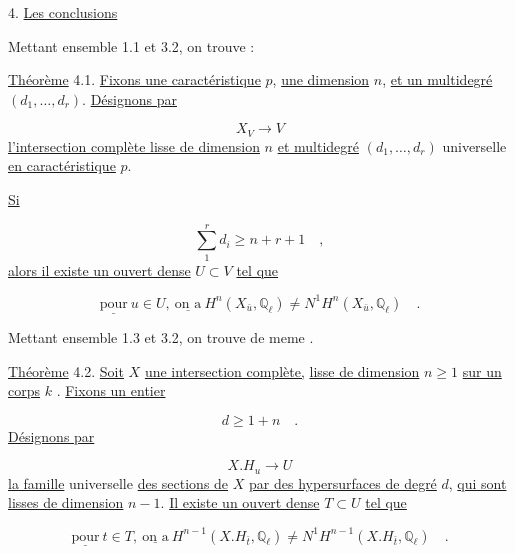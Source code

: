 4. \underline{Les conclusions}

Mettant ensemble 1.1 et 3.2, on trouve :

\underline{Théorème} 4.1. \underline{Fixons une caractéristique} $p$, \underline{une dimension} $n$, \underline{et un multidegré} $(d_1,\ldots,d_r)$. \underline{Désignons par}

\begin{equation}\tag{4.1.0}
X_V \longrightarrow V
\end{equation}
\underline{l'intersection complète lisse de dimension} $n$ \underline{et multidegré} $(d_1,\ldots,d_r)$ universelle \underline{en caractéristique} $p$.

\underline{Si}

\begin{equation}\tag{4.1.1}
\sum_{1}^{r} d_i \geqslant n + r + 1 \quad ,
\end{equation}
\underline{alors il existe un ouvert dense} $U \subset V$ \underline{tel que}

\begin{equation}\tag{4.1.2}
\underline{\text{pour}}\ u \in U, \ \underline{\text{on a}}\ H^n(X_{\bar{u}}, \mathbb{Q}_\ell) \neq N^1 H^n(X_{\bar{u}}, \mathbb{Q}_\ell) \quad .
\end{equation}


Mettant ensemble 1.3 et 3.2, on trouve de meme .

\underline{Théorème} 4.2. \underline{Soit} $X$ \underline{une intersection complète,} \underline{lisse de dimension} $n \geqslant 1$ \underline{sur un corps} $k$ . \underline{Fixons un entier}

\begin{equation}\tag{4.2.1}
d \geqslant 1 + n \quad .
\end{equation}
\underline{Désignons par}

\begin{equation}\tag{4.2.2}
X.H_u \longrightarrow U
\end{equation}
\underline{la famille} universelle \underline{des sections de} $X$ \underline{par des hypersurfaces de degré} $d$, \underline{qui sont lisses de dimension} $n - 1$. \underline{Il existe un ouvert dense} $T \subset U$ \underline{tel que}

\begin{equation}\tag{4.2.3}
\underline{\text{pour}}\ t \in T, \ \underline{\text{on a}}\ H^{n-1}(X.H_{\bar{t}}, \mathbb{Q}_\ell) \neq N^1 H^{n-1}(X.H_{\bar{t}}, \mathbb{Q}_\ell) \quad .
\end{equation}

